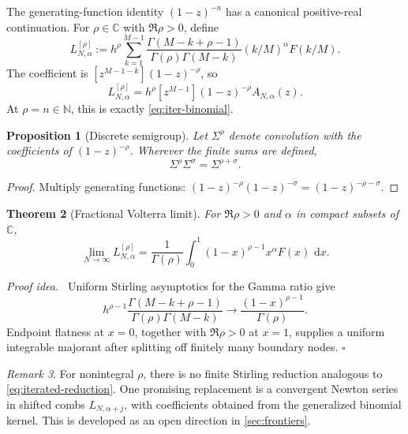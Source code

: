 \documentclass[11pt,oneside]{article}
\numberwithin{equation}{section}
\newtheorem{theorem}{Theorem}[section]
\newtheorem{proposition}[theorem]{Proposition}
\theoremstyle{definition}
\theoremstyle{remark}
\newtheorem{remark}[theorem]{Remark}
\newenvironment{proofidea}{\par\smallskip\noindent\textit{Proof idea.}\ }{\hfill$\square$\par\smallskip}
\newcommand{\C}{\mathbb C}
\newcommand{\N}{\mathbb N}
\newcommand{\dd}{\,\mathrm d}
\begin{document}
The generating-function identity \((1-z)^{-n}\) has a canonical positive-real
continuation.  For \(\rho\in\C\) with \(\Re\rho>0\), define
\begin{equation}
 L_{N,\alpha}^{[\rho]}
 :=h^\rho\sum_{k=1}^{M-1}
 \frac{\Gamma(M-k+\rho-1)}{\Gamma(\rho)\Gamma(M-k)}
 (k/M)^\alpha F(k/M).
 \label{eq:fractional-sum}
\end{equation}
The coefficient is
\([
 z^{M-1-k}](1-z)^{-\rho}
\), so
\begin{equation}
 \boxed{\displaystyle
 L_{N,\alpha}^{[\rho]}
 =h^\rho[z^{M-1}](1-z)^{-\rho}A_{N,\alpha}(z).}
 \label{eq:fractional-coeff}
\end{equation}
At \(\rho=n\in\N\), this is exactly \eqref{eq:iter-binomial}.

\begin{proposition}[Discrete semigroup]
\label{prop:discrete-semigroup}
Let \(\Sigma^\rho\) denote convolution with the coefficients of
\((1-z)^{-\rho}\).  Wherever the finite sums are defined,
\begin{equation}
 \Sigma^\rho\Sigma^\sigma=\Sigma^{\rho+\sigma}.
 \label{eq:discrete-semigroup}
\end{equation}
\end{proposition}

\begin{proof}
Multiply generating functions:
\((1-z)^{-\rho}(1-z)^{-\sigma}=(1-z)^{-\rho-\sigma}\).
\end{proof}

\begin{theorem}[Fractional Volterra limit]
\label{thm:fractional-limit}
For \(\Re\rho>0\) and \(\alpha\) in compact subsets of \(\C\),
\begin{equation}
 \boxed{\displaystyle
 \lim_{N\to\infty}L_{N,\alpha}^{[\rho]}
 =\frac1{\Gamma(\rho)}
 \int_0^1(1-x)^{\rho-1}x^\alpha F(x)\,\dd x.}
 \label{eq:fractional-limit}
\end{equation}
\end{theorem}

\begin{proofidea}
Uniform Stirling asymptotics for the Gamma ratio give
\[
 h^{\rho-1}
 \frac{\Gamma(M-k+\rho-1)}{\Gamma(\rho)\Gamma(M-k)}
 \to\frac{(1-x)^{\rho-1}}{\Gamma(\rho)}.
\]
Endpoint flatness at \(x=0\), together with \(\Re\rho>0\) at \(x=1\), supplies a
uniform integrable majorant after splitting off finitely many boundary nodes.
\end{proofidea}

\begin{remark}
For nonintegral \(\rho\), there is no finite Stirling reduction analogous to
\eqref{eq:iterated-reduction}.  One promising replacement is a convergent Newton series
in shifted combs \(L_{N,\alpha+j}\), with coefficients obtained from the generalized
binomial kernel.  This is developed as an open direction in \cref{sec:frontiers}.
\end{remark}
\end{document}
